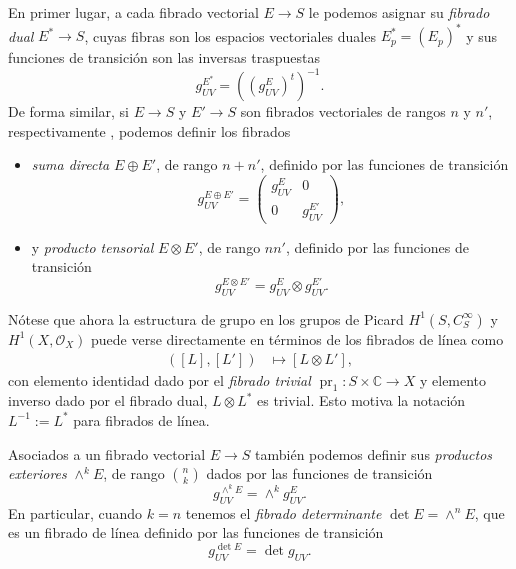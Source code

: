\documentclass[12pt,a4paper]{article}
\theoremstyle{definition} \newtheorem{defn}[thm]{Definición}
\theoremstyle{definition} \newtheorem{ejemplo}[thm]{Ejemplo}
\theoremstyle{definition} \newtheorem{ejercicio}[thm]{Ejercicio}
\def\CC{\mathbb{C}}
\def\OO{\mathscr{O}}
\DeclareMathOperator{\pr}{pr}
\begin{document}
	  En primer lugar, a cada fibrado vectorial $E\rightarrow S$ le podemos asignar su \emph{fibrado dual} $E^*\rightarrow S$, cuyas fibras son los espacios vectoriales duales $E^*_p = (E_p)^*$ y sus funciones de transición son las inversas traspuestas
	  \begin{equation*}
	    g^{E^*}_{UV} = ((g^E_{UV})^t)^{-1}.
	  \end{equation*}
	  De forma similar, si $E\rightarrow S$ y $E'\rightarrow S$ son fibrados vectoriales de rangos $n$ y $n'$, respectivamente , podemos definir los fibrados
	  \begin{itemize}
	    \item \emph{suma directa} $E\oplus E'$, de rango $n+n'$, definido por las funciones de transición
	      \begin{equation*}
		g_{UV}^{E\oplus E'}=		\left( 
		\begin{array}{cc}
		  g_{UV}^E & 0 \\
		  0 & g_{UV}^{E'}
		\end{array}
		 \right),
	      \end{equation*}
	    \item y \emph{producto tensorial} $E\otimes E'$, de rango $nn'$, definido por las funciones de transición
	      \begin{equation*}
		g^{E\otimes E'}_{UV} = g_{UV}^E \otimes g_{UV}^{E'}.
	      \end{equation*}
	  \end{itemize}
	  Nótese que ahora la estructura de grupo en los grupos de Picard $H^1(S,C^\infty_S)$ y $H^1(X,\OO_X)$ puede verse directamente en términos de los fibrados de línea como
	  \begin{align*}
	    ([L],[L']) &\longmapsto [L\otimes L'],
	    \end{align*}
	    con elemento identidad dado por el \emph{fibrado trivial} $\pr_1:S\times \CC \rightarrow X$ y elemento inverso dado por el fibrado dual, $L\otimes L^*$ es trivial. Esto motiva la notación $L^{-1}:=L^*$ para fibrados de línea.

	    Asociados a un fibrado vectorial $E\rightarrow S$ también podemos definir sus \emph{productos exteriores} $\wedge^k E$, de rango ${n}\choose{k}$ dados por las funciones de transición
	    \begin{equation*}
	      g^{\wedge^k E}_{UV} = \wedge^k g^{E}_{UV}.
	    \end{equation*}
	    En particular, cuando $k=n$ tenemos el \emph{fibrado determinante} $\det E = \wedge^n E$, que es un fibrado de línea definido por las funciones de transición
	    \begin{equation*}
	      g^{\det E}_{UV} = \det g_{UV}.
	    \end{equation*}
\end{document}
